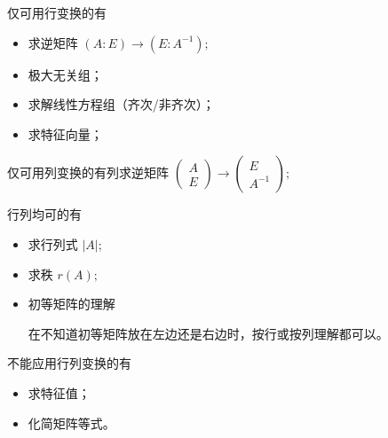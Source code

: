 
仅可用行变换的有\begin{itemize}
    \item 求逆矩阵 $ (A : E) \rightarrow (E:A^{-1}); $ 
    \item 极大无关组；
    \item 求解线性方程组（齐次/非齐次）；
    \item 求特征向量；
\end{itemize}

仅可用列变换的有列求逆矩阵 $ \begin{pmatrix}
    A\\E
\end{pmatrix}\rightarrow \begin{pmatrix}
    E\\ A^{-1}
\end{pmatrix}; $ 

行列均可的有\begin{itemize}
    \item 求行列式 $ |A|; $ 
    \item 求秩 $ r(A); $ 
    \item 初等矩阵的理解
    
    在不知道初等矩阵放在左边还是右边时，按行或按列理解都可以。
\end{itemize}

不能应用行列变换的有\begin{itemize}
    \item 求特征值；
    \item 化简矩阵等式。
\end{itemize}